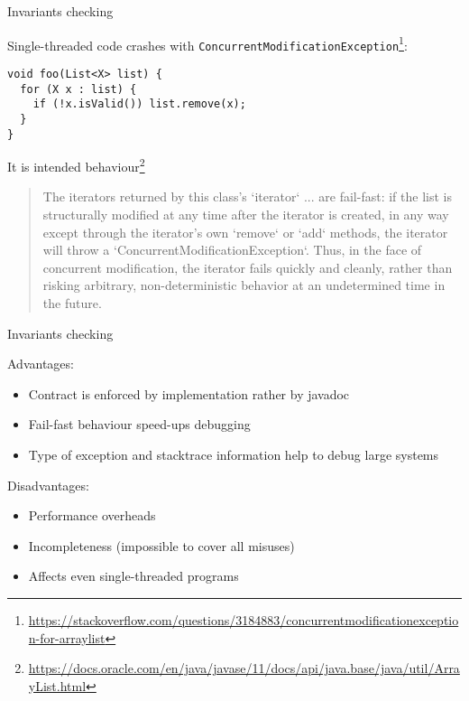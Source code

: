 \begin{frame}[fragile]{Invariants checking}

Single-threaded code crashes with \texttt{ConcurrentModificationException}\footnote{\tiny\url{https://stackoverflow.com/questions/3184883/concurrentmodificationexception-for-arraylist}}:

\begin{verbatim}
void foo(List<X> list) {  
  for (X x : list) {
    if (!x.isValid()) list.remove(x);
  }
}
\end{verbatim}

\pause

It is intended behaviour\footnote<2->{\tiny\url{https://docs.oracle.com/en/java/javase/11/docs/api/java.base/java/util/ArrayList.html}}
\begin{quote}
  The iterators returned by this class's `iterator` ... are fail-fast: if the list is structurally modified at any time after the iterator is created, in any way except through the iterator's own `remove` or `add` methods, the iterator will throw a `ConcurrentModificationException`. Thus, in the face of concurrent modification, the iterator fails quickly and cleanly, rather than risking arbitrary, non-deterministic behavior at an undetermined time in the future. 
\end{quote}

\end{frame}


\begin{frame}[fragile]{Invariants checking}

Advantages:
\begin{itemize}
  \item Contract is enforced by implementation rather by javadoc
  \item Fail-fast behaviour speed-ups debugging
  \item Type of exception and stacktrace information help to debug large systems 
\end{itemize}

Disadvantages:
\begin{itemize}
  \item Performance overheads
  \item Incompleteness (impossible to cover all misuses)
  \item Affects even single-threaded programs
\end{itemize}
\end{frame}

